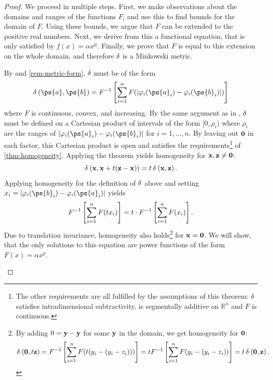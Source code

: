 \begin{proof}
	We proceed in multiple steps.
	First, we make observations about the domains and ranges of the functions $F_i$ and use this to find bounds for the domain of $F$. Using these bounds, we argue that $F$ can be extended to the positive real numbers.
	Next, we derive from this a functional equation, that is only satisfied by $f(x) = \alpha x^p$.
	Finally, we prove that $F$ is equal to this extension on the whole domain, and therefore $\operatorname{\delta}$ is a Minkowski metric.
	\setcounter{proofpart}{-1}
	\begin{proofpart}
		By  and \cref{rem-metric-form}, $\operatorname{\delta}$ must be of the form
		\begin{equation*}
			\metr{\ps{a}}{\ps{b}} = F^{-1} \left [ \sum_{i=1}^{n} F(| \varphi_i(\ps{a}_i) - \varphi_i(\ps{b}_i)|)  \right]
		\end{equation*}
		where $F$ is continuous, convex, and increasing.
    By the same argument as in , $\operatorname{\delta}$ must be defined on a Cartesian product of intervals of the form $[0,\rho_i)$ where $\rho_i$ are the ranges of $| \varphi_i(\ps{a}_i) - \varphi_i(\ps{b}_i)|$ for $i=1, \dots, n$. By leaving out $\mathbf{0}$ in each factor, this Cartesian product is open and satisfies the requirements\footnote{The other requirements are all fulfilled by the assumptions of this theorem: $\operatorname{\delta}$ satisfies intradimensional subtractivity, is segmentally additive on $\mathbb{R}^{n}$ and $F$ is continuous.} of \cref{thm-homogeneity}. Applying the theorem yields homogeneity for $\mathbf{x}, \mathbf{z} \neq \mathbf{0}$:
		$$\operatorname{\delta}_{} \left( \mathbf{x}, \mathbf{x}+ t(\mathbf{z}-\mathbf{x}) \right) = t \operatorname{\delta}_{} \left( \mathbf{x}, \mathbf{z} \right).$$
		Applying homogeneity for the definition of $\operatorname{\delta}$ above and setting $\ta_i = |\varphi_i(\ps{b}_i) - \varphi_i(\ps{a}_i)|$ yields
		\begin{equation}\label{proof-homogen-eq}
			F^{-1} \left [ \sum_{i=1}^{n} F(t x_i)  \right] = t \cdot F^{-1} \left [ \sum_{i=1}^{n} F(x_i)  \right].
		\end{equation}
		Due to translation invariance, homogeneity also holds\footnote{By adding $0 = \mathbf{y} - \mathbf{y}$ for some $\mathbf{y}$ in the domain, we get homogeneity for $\mathbf{0}$:
			\begin{equation*}
				\operatorname{\delta}_{} \left( \mathbf{0}, t \mathbf{z} \right) =F^{-1} \left [ \sum_{i=1}^{n} F(t (y_i - (y_i - z_i))) \right]
				= t F^{-1} \left [ \sum_{i=1}^{n} F(y_i - (y_i - z_i)) \right]
				= t \operatorname{\delta}_{} \left( \mathbf{0}, \mathbf{z} \right).
			\end{equation*}} for $\mathbf{x} = \mathbf{0}$. We will show, that the only solutions to this equation are power functions of the form $F(x) = \alpha x^p$.


\end{proofpart}
\end{proof}

